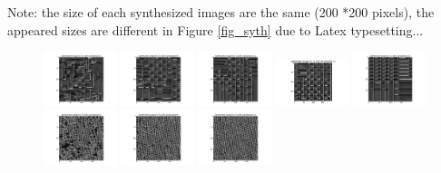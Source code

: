 \documentclass{extarticle}
\theoremstyle{definition}
\theoremstyle{definition}
\begin{document}
Note: the size of each synthesized images are the same (200 *200 pixels), the appeared sizes are different in Figure \ref{fig_syth} due to Latex typesetting...
\begin{figure}[H]
	\includegraphics[width = 0.19\textwidth]{./figures/Syth_T1_size_5.png}
	\includegraphics[width = 0.19\textwidth]{./figures/Syth_T1_size_9.png}
	\includegraphics[width = 0.19\textwidth]{./figures/Syth_T1_size_11.png}
	\includegraphics[width = 0.19\textwidth]{./figures/Syth_T1_size_15.png}	
	\includegraphics[width = 0.19\textwidth]{./figures/Syth_T1_size_23.png}
	\includegraphics[width = 0.19\textwidth]{./figures/Syth_T2_size_5.png}
	\includegraphics[width = 0.19\textwidth]{./figures/Syth_T2_size_9.png}
	\includegraphics[width = 0.19\textwidth]{./figures/Syth_T2_size_11.png}

\end{figure}
\end{document}
